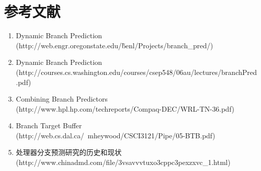 \documentclass[adobefonts, nocap]{ctexart}
\begin{document}
  \section{参考文献}
    \begin{enumerate}
      \item Dynamic Branch Prediction\\(http://web.engr.oregonstate.edu/\~benl/Projects/branch\_pred/)
      \item Dynamic Branch Prediction\\(http://courses.cs.washington.edu/courses/csep548/06au/lectures/branchPred.pdf)
      \item Combining Branch Predictors\\(http://www.hpl.hp.com/techreports/Compaq-DEC/WRL-TN-36.pdf)
      \item Branch Target Buffer\\(http://web.cs.dal.ca/~mheywood/CSCI3121/Pipe/05-BTB.pdf)
      \item 处理器分支预测研究的历史和现状\\(http://www.chinadmd.com/file/3vsavvvtuxo3cppc3pexzxvc\_1.html)
    \end{enumerate}
\end{document}
